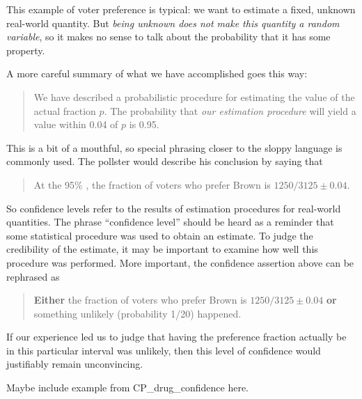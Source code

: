 This example of voter preference is typical: we want to estimate a fixed,
unknown real-world quantity.  But \emph{being unknown does not make this
  quantity a random variable}, so it makes no sense to talk about the
probability that it has some property.

A more careful summary of what we have accomplished goes this way:
\begin{quote}
We have described a probabilistic procedure for estimating the value of
the actual fraction $p$.  The probability that \emph{our estimation
procedure} will yield a value within 0.04 of $p$ is 0.95.
\end{quote}
This is a bit of a mouthful, so special phrasing closer to the sloppy
language is commonly used.  The pollster would describe his conclusion by
saying that
\begin{quote}
At the 95\% , the fraction of voters
who prefer Brown is $1250/3125 \pm 0.04$.
\end{quote}

So confidence levels refer to the results of estimation procedures for
real-world quantities.  The phrase ``confidence level'' should be
heard as a reminder that some statistical procedure was used to obtain
an estimate.  To judge the credibility of the estimate, it may be
important to examine how well this procedure was performed.  More
important, the confidence assertion above can be rephrased as
\begin{quote}
\textbf{Either} the fraction of voters who prefer Brown is $1250/3125
\pm 0.04$ \textbf{or} something unlikely (probability 1/20) happened.
\end{quote}
If our experience led us to judge that having the preference fraction
actually be in this particular interval was unlikely, then this level
of confidence would justifiably remain unconvincing.


\begin{editingnotes}
Maybe include example from CP\_drug\_confidence here.
\end{editingnotes}

\begin{problems}

\classproblems
{}

\examproblems
{}

\end{problems}

